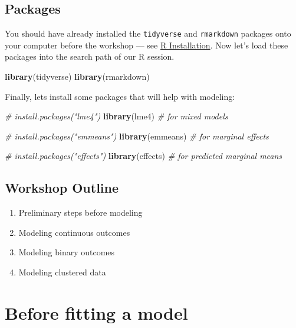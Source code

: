\documentclass[
]{book}
\newenvironment{Shaded}{\begin{snugshade}}{\end{snugshade}}
\newcommand{\CommentTok}[1]{\textcolor[rgb]{0.56,0.35,0.01}{\textit{#1}}}
\newcommand{\KeywordTok}[1]{\textcolor[rgb]{0.13,0.29,0.53}{\textbf{#1}}}
\newcommand{\NormalTok}[1]{#1}
\providecommand{\tightlist}{%
  \setlength{\itemsep}{0pt}\setlength{\parskip}{0pt}}
\begin{document}
\hypertarget{packages}{%
\subsection{Packages}\label{packages}}

You should have already installed the \texttt{tidyverse} and \texttt{rmarkdown}
packages onto your computer before the workshop
--- see \href{./Rinstall.html}{R Installation}.
Now let's load these packages into the search path of our R session.

\begin{Shaded}
\begin{Highlighting}[]
\KeywordTok{library}\NormalTok{(tidyverse)}
\KeywordTok{library}\NormalTok{(rmarkdown)}
\end{Highlighting}
\end{Shaded}

Finally, lets install some packages that will help with modeling:

\begin{Shaded}
\begin{Highlighting}[]
\CommentTok{# install.packages("lme4")}
\KeywordTok{library}\NormalTok{(lme4)  }\CommentTok{# for mixed models}

\CommentTok{# install.packages("emmeans")}
\KeywordTok{library}\NormalTok{(emmeans)  }\CommentTok{# for marginal effects}

\CommentTok{# install.packages("effects")}
\KeywordTok{library}\NormalTok{(effects)  }\CommentTok{# for predicted marginal means}
\end{Highlighting}
\end{Shaded}

\hypertarget{workshop-outline}{%
\subsection{Workshop Outline}\label{workshop-outline}}

\begin{enumerate}
\def\labelenumi{\arabic{enumi}.}
\tightlist
\item
  Preliminary steps before modeling
\item
  Modeling continuous outcomes
\item
  Modeling binary outcomes
\item
  Modeling clustered data
\end{enumerate}

\hypertarget{before-fitting-a-model}{%
\section{Before fitting a model}\label{before-fitting-a-model}}
\end{document}
